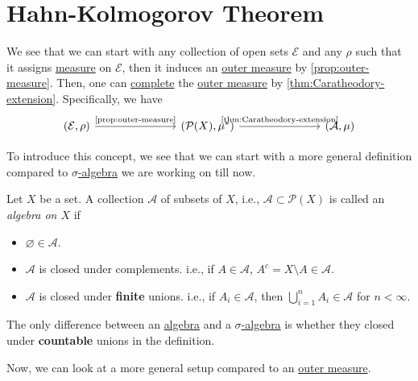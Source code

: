 \section{Hahn-Kolmogorov Theorem}
We see that we can start with any collection of open sets \(\mathcal{E}\) and any \(\rho\) such that it assigns \hyperref[def:measure]{measure} on \(\mathcal{E}\), then it induces an \hyperref[def:outer-measure]{outer measure} by \autoref{prop:outer-measure}. Then, one can \hyperref[def:complete-measure-space]{complete} the \hyperref[def:outer-measure]{outer measure} by \autoref{thm:Caratheodory-extension}. Specifically, we have
\[
	\begin{tikzcd}
		(\mathcal{E}, \rho) \ar[rrr, "\text{\autoref{prop:outer-measure}}"] &&& (\mathcal{P}(X), \mu^{\ast} ) \ar[rrr, "\text{\autoref{thm:Caratheodory-extension}}"] &&& (\mathcal{A} , \mu)
	\end{tikzcd}
\]

To introduce this concept, we see that we can start with a more general definition compared to \hyperref[def:sigma-algebra]{\(\sigma\)-algebra} we are working on till now.
\begin{definition}[Algebra]\label{def:algebra}
	Let \(X\) be a set. A collection \(\mathcal{A} \) of subsets of \(X\), i.e., \(\mathcal{A}\subset \mathcal{P} (X) \) is called an \emph{algebra on \(X\)} if
	\begin{itemize}
		\item \(\varnothing \in \mathcal{A} \).
		\item \(\mathcal{A} \) is closed under complements. i.e., if \(A\in \mathcal{A} \), \(A^c = X\setminus A\in \mathcal{A} \).
		\item \(\mathcal{A} \) is closed under \textbf{finite} unions. i.e., if \(A_i\in \mathcal{A} \), then \(\bigcup_{i=1}^{n} A_{i}\in \mathcal{A} \) for \(n<\infty \).
	\end{itemize}
\end{definition}

\begin{remark}
	The only difference between an \hyperref[def:algebra]{algebra} and a \hyperref[def:sigma-algebra]{\(\sigma\)-algebra} is whether they closed under \textbf{countable} unions in the definition.
\end{remark}

Now, we can look at a more general setup compared to an \hyperref[def:outer-measure]{outer measure}.


